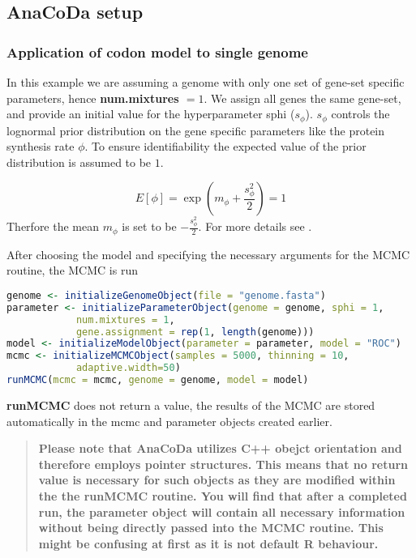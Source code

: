 \subsection{AnaCoDa setup}
\subsubsection{Application of codon model to single genome}
In this example we are assuming a genome with only one set of gene-set specific parameters, hence \textbf{num.mixtures $ = 1$}. 
We assign all genes the same gene-set, and provide an initial value for the hyperparameter sphi ($s_\phi$). $s_\phi$ controls the lognormal prior distribution on the gene specific parameters like the protein synthesis rate $\phi$. 
To ensure identifiability the expected value of the prior distribution is assumed to be $1$.

\begin{equation}
E[\phi] = \exp\left(m_\phi + \frac{s^2_\phi}{2}\right) = 1
\end{equation}
Therfore the mean $m_\phi$ is set to be $-\frac{s^2_\phi}{2}$.
For more details see \citet{gilchrist2015}.

After choosing the model and specifying the necessary arguments for the MCMC routine, the MCMC is run

\begin{lstlisting}[language=R]
genome <- initializeGenomeObject(file = "genome.fasta")
parameter <- initializeParameterObject(genome = genome, sphi = 1, 
			num.mixtures = 1, 
			gene.assignment = rep(1, length(genome)))
model <- initializeModelObject(parameter = parameter, model = "ROC")
mcmc <- initializeMCMCObject(samples = 5000, thinning = 10, 
			adaptive.width=50)
runMCMC(mcmc = mcmc, genome = genome, model = model)
\end{lstlisting}

\textbf{runMCMC} does not return a value, the results of the MCMC are stored automatically in the mcmc and parameter
objects created earlier.

\begin{quote}
\textbf{Please note that AnaCoDa utilizes C++ obejct orientation and therefore employs pointer structures. 
This means that no return value is necessary for such objects as they are modified within the the runMCMC routine. 
You will find that after a completed run, the parameter object will contain all necessary information without being directly passed into the MCMC routine. 
This might be confusing at first as it is not default R behaviour.}
\end{quote}


